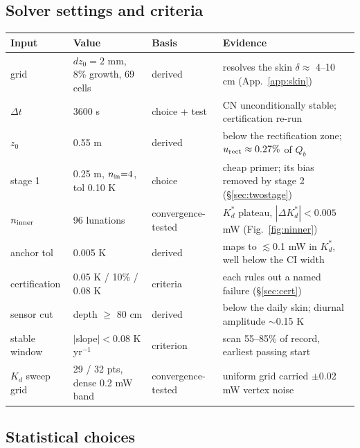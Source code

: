 \documentclass[11pt]{report}
\begin{document}
\subsection*{Solver settings and criteria}

\begin{center}\footnotesize
\begin{tabular}{@{}llll@{}}
\toprule
Input & Value & Basis & Evidence \\
\midrule
grid & $dz_0{=}2$ mm, 8\% growth, 69 cells & derived & resolves the skin $\delta\approx$ 4--10 cm (App.~\ref{app:skin}) \\
$\Delta t$ & 3600 s & choice + test & CN unconditionally stable; certification re-run \\
$z_0$ & 0.55 m & derived & below the rectification zone; $u_{\rm rect}\approx0.27\%$ of $Q_b$ \\
stage 1 & 0.25 m, $n_{\rm in}{=}4$, tol 0.10 K & choice & cheap primer; its bias removed by stage 2 (\S\ref{sec:twostage}) \\
$n_{\rm inner}$ & 96 lunations & convergence-tested & $K_d^{*}$ plateau, $|\Delta K_d^{*}|<0.005$ mW (Fig.~\ref{fig:ninner}) \\
anchor tol & 0.005 K & derived & maps to $\lesssim$0.1 mW in $K_d^{*}$, well below the CI width \\
certification & 0.05 K / 10\% / 0.08 K & criteria & each rules out a named failure (\S\ref{sec:cert}) \\
sensor cut & depth $\geq$ 80 cm & derived & below the daily skin; diurnal amplitude $\sim$0.15 K \\
stable window & $|$slope$| < 0.08$ K yr$^{-1}$ & criterion & scan 55--85\% of record, earliest passing start \\
$K_d$ sweep grid & 29 / 32 pts, dense 0.2 mW band & convergence-tested & uniform grid carried $\pm$0.02 mW vertex noise \\
\bottomrule
\end{tabular}
\end{center}

\subsection*{Statistical choices}
\end{document}
